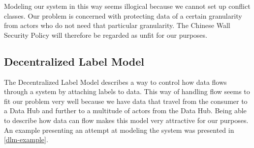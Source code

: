 Modeling our system in this way seems illogical because we cannot set up conflict classes.
Our problem is concerned with protecting data of a certain granularity from actors who do not need that particular granularity.
The Chinese Wall Security Policy will therefore be regarded as unfit for our purposes.

\subsection{Decentralized Label Model}
The Decentralized Label Model describes a way to control how data flows through a system by attaching labels to data.
This way of handling flow seems to fit our problem very well because we have data that travel from the consumer to a Data Hub and further to a multitude of actors from the Data Hub.
Being able to describe how data can flow makes this model very attractive for our purposes.
An example presenting an attempt at modeling the system was presented in \cref{dlm-example}.